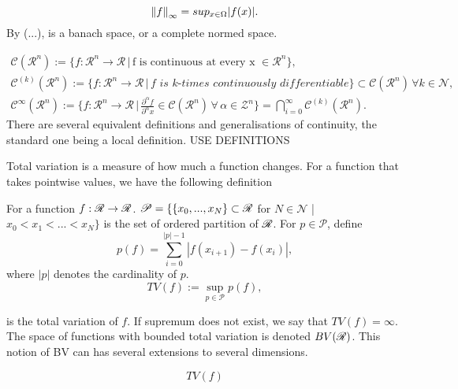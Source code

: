 \begin{equation}
    \left\lVert f\right\rVert_\infty = sup_{x \in \Omega} |f(x)|.
\end{equation}
By (...), is a banach space, or a complete normed space. 

\begin{align*}
    \mathscr{C}(\mathscr{R}^n) := \{f : \mathscr{R}^n \rightarrow \mathscr{R} \,|\, \text{f is continuous at every x $\in \mathscr{R}^n$}\}, \\
    \mathscr{C}^{(k)}(\mathscr{R}^n) := \{f : \mathscr{R}^n \rightarrow \mathscr{R} \,|\, \textit{f is $k$-times continuously differentiable}\} \subset \mathscr{C}(\mathscr{R}^n) \, \forall k \in \mathscr{N}, \\
    \mathscr{C}^{\infty}(\mathscr{R}^n) := \{f : \mathscr{R}^n \rightarrow \mathscr{R} \,|\, \frac{\partial^{\alpha} f}{\partial^{\alpha} x}\in \mathscr{C}(\mathscr{R}^n) \, \forall \, \alpha \in \mathscr{Z}^n\} = \bigcap_{i=0}^{\infty} \mathscr{C}^{(k)}(\mathscr{R}^n).
\end{align*}
There are several equivalent definitions and generalisations of continuity, the standard one being a local definition. 
USE DEFINITIONS 

Total variation is a measure of how much a function changes. For a function that takes pointwise values, we have the following definition

\begin{definition}
For a function $f : \mathscr{R} \rightarrow \mathscr{R}$. $\mathscr{P} = \{\{x_0, ..., x_N\} \subset \mathscr{R}$ for $N \in \mathscr{N}$ | $x_0 < x_1 < ... < x_N \}$ is the set of ordered partition of $\mathscr{R}$. For $p \in \mathscr{P}$, define
\begin{equation}
    p(f) = \sum_{i=0}^{\vert p\vert -1} |f(x_{i+1}) - f(x_i)|,
\end{equation}
where $\vert p \vert$ denotes the cardinality of $p$. 
\begin{equation}
    TV(f) := \sup_{p \in \mathscr{P}} p(f),
\end{equation}
\end{definition}
is the total variation of $f$. If supremum does not exist, we say that $TV(f) = \infty$. The space of functions with bounded total variation is denoted $BV(\mathscr{R})$. This notion of BV can has several extensions to several dimensions. 

\begin{equation}
TV(f)     
\end{equation}

